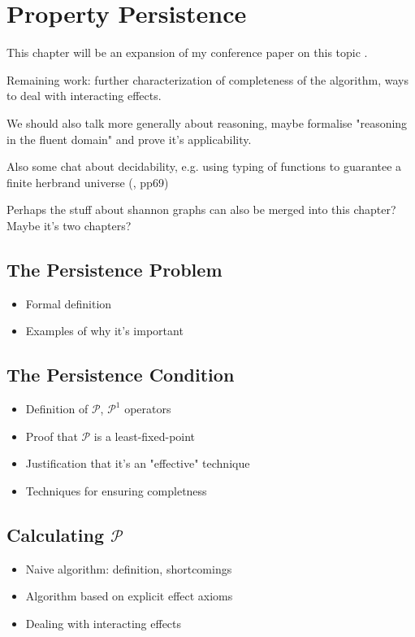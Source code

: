 \chapter{Property Persistence}\label{ch:persistence}

This chapter will be an expansion of my conference paper on this topic \cite{kelly07sc_persistence}.

Remaining work: further characterization of completeness of the algorithm, ways to deal with interacting effects.

We should also talk more generally about reasoning, maybe formalise
"reasoning in the fluent domain" and prove it's applicability.

Also some chat about decidability, e.g. using typing of functions to
guarantee a finite herbrand universe (\cite{levesque04krr_book}, pp69)

Perhaps the stuff about shannon graphs can also be merged into this chapter?
Maybe it's two chapters?

\section{The Persistence Problem}

\begin{itemize}
\item Formal definition
\item Examples of why it's important
\end{itemize}

\section{The Persistence Condition}

\begin{itemize}
\item Definition of $\mathcal{P}$, $\mathcal{P}^{1}$ operators
\item Proof that $\mathcal{P}$ is a least-fixed-point
\item Justification that it's an "effective" technique
\item Techniques for ensuring completness
\end{itemize}

\section{Calculating $\mathcal{P}$}

\begin{itemize}
\item Naive algorithm: definition, shortcomings
\item Algorithm based on explicit effect axioms
\item Dealing with interacting effects
\end{itemize}



